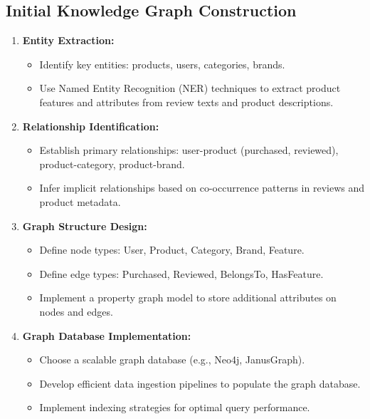 \documentclass{article}
\begin{document}
\subsection{Initial Knowledge Graph Construction}
\begin{enumerate}
    \item \textbf{Entity Extraction:}
    \begin{itemize}
        \item Identify key entities: products, users, categories, brands.
        \item Use Named Entity Recognition (NER) techniques to extract product features and attributes from review texts and product descriptions.
    \end{itemize}
    
    \item \textbf{Relationship Identification:}
    \begin{itemize}
        \item Establish primary relationships: user-product (purchased, reviewed), product-category, product-brand.
        \item Infer implicit relationships based on co-occurrence patterns in reviews and product metadata.
    \end{itemize}
    
    \item \textbf{Graph Structure Design:}
    \begin{itemize}
        \item Define node types: User, Product, Category, Brand, Feature.
        \item Define edge types: Purchased, Reviewed, BelongsTo, HasFeature.
        \item Implement a property graph model to store additional attributes on nodes and edges.
    \end{itemize}
    
    \item \textbf{Graph Database Implementation:}
    \begin{itemize}
        \item Choose a scalable graph database (e.g., Neo4j, JanusGraph).
        \item Develop efficient data ingestion pipelines to populate the graph database.
        \item Implement indexing strategies for optimal query performance.
    \end{itemize}
\end{enumerate}
\end{document}
